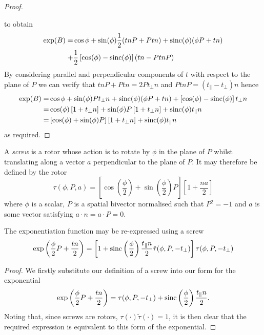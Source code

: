 \begin{proof}
\begin{centering}
\end{centering}

\noindent to obtain
\begin{align*}
\exp(B) = & 
  \cos \phi + \sin(\phi) \frac{1}{2} (tnP + Ptn) + \mathrm{sinc}(\phi) (\phi P + tn) \\
+ & \frac{1}{2} \left[ \cos(\phi) - \mathrm{sinc}(\phi) \right] (tn - PtnP)
\end{align*}
By considering parallel and perpendicular components of $t$ with
respect to the plane of $P$ we can verify that
$tnP + Ptn = 2 Pt_\perp n$ and $PtnP = (t_\parallel - t_\perp)n$ hence
\begin{align*}
\exp(B) = & 
  \cos \phi + \sin(\phi) P t_\perp n + \mathrm{sinc}(\phi) (\phi P + tn) + \left[ \cos(\phi) - \mathrm{sinc}(\phi) \right] t_\perp n \\
  = & \cos (\phi) \left[ 1 + t_\perp n \right] +
  \sin(\phi) P \left[ 1 + t_\perp n \right] + \mathrm{sinc}(\phi) t_\parallel n \\
  = & \left[ \cos(\phi) + \sin(\phi) P \right] \left[ 1 + t_\perp n \right] + \mathrm{sinc}(\phi) t_\parallel n 
\end{align*}
as required.
\end{proof}

\begin{definition}
A \emph{screw} is a rotor whose action is to rotate by $\phi$ in the 
plane of $P$ whilst translating along a vector $a$ perpendicular to
the plane of $P$. It may therefore be 
defined by the rotor 
\[
\tau(\phi, P, a) =
 \left[ \cos\left(\frac{\phi}{2}\right) +
   \sin\left(\frac{\phi}{2}\right)P
 \right]
 \left[
   1 + \frac{na}{2}
 \right]
\]
where $\phi$ is a scalar, $P$ is a spatial bivector normalised such that 
$P^2 = -1$ and $a$ is some vector satisfying $a \cdot n = a \cdot P = 0$.
\end{definition}

\begin{lemma}
The exponentiation function may be re-expressed using a screw
\[
\exp\left(\frac{\phi}{2}P + \frac{tn}{2}\right) =
\left[ 1 + \mathrm{sinc}\left(\frac{\phi}{2}\right)\frac{t_\parallel n}{2} \tilde{\tau}(\phi, P, - t_\perp) \right]
\tau(\phi, P, - t_\perp)
\]
\end{lemma}
\begin{proof}
We firstly substitute our definition of a screw into our form for the exponential
\begin{equation}
\exp\left(\frac{\phi}{2}P + \frac{tn}{2}\right) =
\tau(\phi, P, - t_\perp) + \mathrm{sinc}\left(\frac{\phi}{2}\right)\frac{t_\parallel n}{2}.
\label{eqn:screwform}
\end{equation}
Noting that, since screws are rotors, $\tau( \cdot ) \tilde{\tau}(\cdot) = 1$, it is
then clear that the required expression is equivalent to this form of the exponential.
\end{proof}

